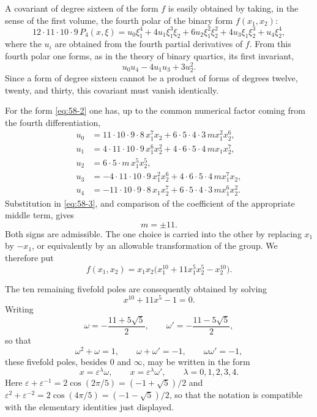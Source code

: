 \documentclass[11pt,a4paper]{book}
\newcommand{\eps}{\varepsilon}
\begin{document}
A covariant of degree sixteen of the form \(f\) is easily obtained by taking, in the sense of the first volume, the fourth polar of the binary form \(f(x_1,x_2)\):
\begin{equation}\label{eq:58-polar}
 12\cdot 11\cdot 10\cdot 9\, P_4(x,\xi)=u_0\xi_1^4+4u_1\xi_1^3\xi_2+6u_2\xi_1^2\xi_2^2+4u_3\xi_1\xi_2^3+u_4\xi_2^4,
\end{equation}
where the \(u_i\) are obtained from the fourth partial derivatives of \(f\).  From this fourth polar one forms, as in the theory of binary quartics, its first invariant,
\begin{equation}\label{eq:58-3}
 u_0u_4-4u_1u_3+3u_2^2.
\end{equation}
Since a form of degree sixteen cannot be a product of forms of degrees twelve, twenty, and thirty, this covariant must vanish identically.

For the form \eqref{eq:58-2} one has, up to the common numerical factor coming from the fourth differentiation,
\begin{align*}
 u_0&=11\cdot10\cdot9\cdot8\,x_1^7x_2+6\cdot5\cdot4\cdot3\,m x_1^2x_2^6,\\
 u_1&=4\cdot11\cdot10\cdot9\,x_1^6x_2^2+4\cdot6\cdot5\cdot4\,m x_1x_2^7,\\
 u_2&=6\cdot5\cdot m\,x_1^5x_2^5,\\
 u_3&=-4\cdot11\cdot10\cdot9\,x_1^2x_2^6+4\cdot6\cdot5\cdot4\,m x_1^7x_2,\\
 u_4&=-11\cdot10\cdot9\cdot8\,x_1x_2^7+6\cdot5\cdot4\cdot3\,m x_1^6x_2^2.
\end{align*}
Substitution in \eqref{eq:58-3}, and comparison of the coefficient of the appropriate middle term, gives
\[
 m=\pm 11.
\]
Both signs are admissible.  The one choice is carried into the other by replacing \(x_1\) by \(-x_1\), or equivalently by an allowable transformation of the group.  We therefore put
\begin{equation}\label{eq:58-4}
 f(x_1,x_2)=x_1x_2\bigl(x_1^{10}+11x_1^5x_2^5-x_2^{10}\bigr).
\end{equation}

The ten remaining fivefold poles are consequently obtained by solving
\[
 x^{10}+11x^5-1=0.
\]
Writing
\begin{equation}\label{eq:58-5}
 \omega=-\frac{11+5\sqrt5}{2}, \qquad
 \omega'=-\frac{11-5\sqrt5}{2},
\end{equation}
so that
\begin{equation}\label{eq:58-6}
 \omega^2+\omega=1,
 \qquad \omega+\omega'=-1,
 \qquad \omega\omega'=-1,
\end{equation}
these fivefold poles, besides \(0\) and \(\infty\), may be written in the form
\begin{equation}\label{eq:58-7}
 x=\eps^\lambda\omega,
 \qquad
 x=\eps^\lambda\omega',
 \qquad \lambda=0,1,2,3,4.
\end{equation}
Here \(\eps+\eps^{-1}=2\cos(2\pi/5)=(-1+\sqrt5)/2\) and \(\eps^2+\eps^{-2}=2\cos(4\pi/5)=(-1-\sqrt5)/2\), so that the notation is compatible with the elementary identities just displayed.
\end{document}
